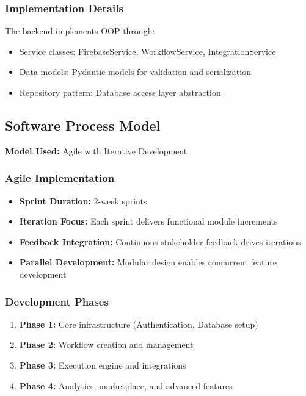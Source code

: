 \documentclass[12pt,a4paper]{article}
\begin{document}
\subsubsection{Implementation Details}
The backend implements OOP through:
\begin{itemize}
    \item Service classes: FirebaseService, WorkflowService, IntegrationService
    \item Data models: Pydantic models for validation and serialization
    \item Repository pattern: Database access layer abstraction
\end{itemize}

\subsection{Software Process Model}
\textbf{Model Used:} Agile with Iterative Development

\subsubsection{Agile Implementation}
\begin{itemize}
    \item \textbf{Sprint Duration:} 2-week sprints
    \item \textbf{Iteration Focus:} Each sprint delivers functional module increments
    \item \textbf{Feedback Integration:} Continuous stakeholder feedback drives iterations
    \item \textbf{Parallel Development:} Modular design enables concurrent feature development
\end{itemize}

\subsubsection{Development Phases}
\begin{enumerate}
    \item \textbf{Phase 1:} Core infrastructure (Authentication, Database setup)
    \item \textbf{Phase 2:} Workflow creation and management
    \item \textbf{Phase 3:} Execution engine and integrations
    \item \textbf{Phase 4:} Analytics, marketplace, and advanced features
\end{enumerate}
\end{document}
